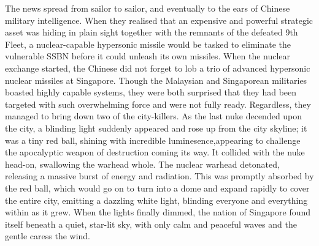             The news spread from sailor to sailor, and eventually to the ears of Chinese military intelligence. When they realised that an expensive and powerful strategic asset was hiding in plain sight together with the remnants of the defeated 9th Fleet, a nuclear-capable hypersonic missile would be tasked to eliminate the vulnerable SSBN before it could unleash its own missiles.
            When the nuclear exchange started, the Chinese did not forget to lob a trio of advanced hypersonic nuclear missiles at Singapore. Though the Malaysian and Singaporean militaries boasted highly capable systems, they were both surprised that they had been targeted with such overwhelming force and were not fully ready. Regardless, they managed to bring down two of the city-killers. 
            As the last nuke decended upon the city, a blinding light suddenly appeared and rose up from the city skyline; it was a tiny red ball, shining with incredible luminesence,appearing to challenge the apocalyptic weapon of destruction coming its way. It collided with the nuke head-on, swallowing the warhead whole.
            The nuclear warhead detonated, releasing a massive burst of energy and radiation. This was promptly absorbed by the red ball, which would go on to turn into a dome and expand rapidly to cover the entire city, emitting a dazzling white light, blinding everyone and everything within as it grew.
            When the lights finally dimmed, the nation of Singapore found itself beneath a quiet, star-lit sky, with only calm and peaceful waves and the gentle caress the wind.